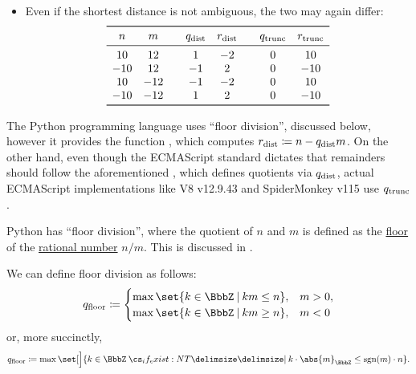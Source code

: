 \begin{remark}
\begin{thmenum}
\begin{itemize}
      \item Even if the shortest distance is not ambiguous, the two may again differ:
      \begin{equation*}
        \begin{array}{c c !{\quad} c c !{\quad} c c}
          \toprule
          n   & m   & q_{\T{dist}} & r_{\T{dist}} & q_{\T{trunc}} & r_{\T{trunc}} \\
          \midrule
          10  & 12  & 1            & -2           & 0             & 10            \\
          -10 & 12  & -1           & 2            & 0             & -10           \\
          10  & -12 & -1           & -2           & 0             & 10            \\
          -10 & -12 & 1            & 2            & 0             & -10           \\
          \bottomrule
        \end{array}
      \end{equation*}
    \end{itemize}

    The Python programming language uses \enquote{floor division}, discussed below, however it provides the function , which computes \( r_{\T{dist}} \coloneqq n - q_{\T{dist}} m \). On the other hand, even though the ECMAScript standard \cite[\S 6.1.6.1.5]{ECMA:262} dictates that remainders should follow the aforementioned \cite{IEEE:754:2019}, which defines quotients via \( q_{\T{dist}} \), actual ECMAScript implementations like V8 v12.9.43 and SpiderMonkey v115 use \( q_{\T{trunc}} \).

     Python has \enquote{floor division}, where the quotient of \( n \) and \( m \) is defined as the \hyperref[def:real_floor_ceiling]{floor} of the \hyperref[def:rational_numbers]{rational number} \( n / m \). This is discussed in \cite{PythonDocs:3.12:math} \cite{PEP:238}.

    We can define floor division as follows:
    \begin{equation}\label{eq:rem:integer_division_uniqueness/floor/q_cases}
      q_{\floor} \coloneqq \begin{cases}
        \max\set{ k \in \BbbZ \given km \leq n }, &m > 0, \\
        \max\set{ k \in \BbbZ \given km \geq n }, &m < 0
      \end{cases}
    \end{equation}
    or, more succinctly,
    \begin{equation}\label{eq:rem:integer_division_uniqueness/floor/q}
      q_{\floor} \coloneqq \max\set[\Big]{ k \in \BbbZ \given* k \cdot \abs{m}_\BbbZ \leq \sgn(m) \cdot n }.
    \end{equation}


\end{thmenum}
\end{remark}
